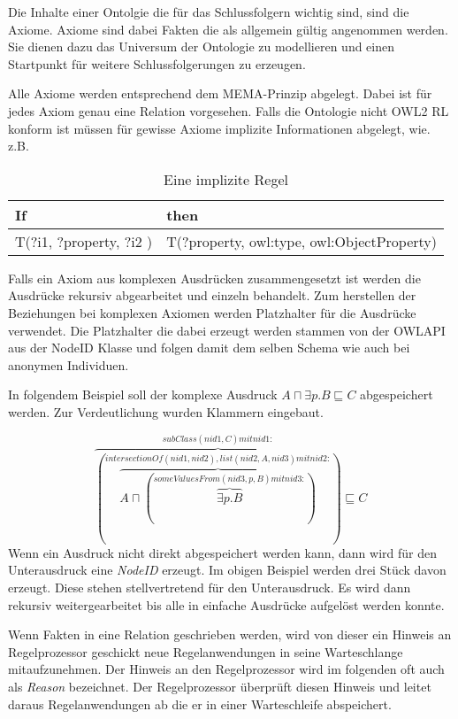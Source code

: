 Die Inhalte einer Ontolgie die für das Schlussfolgern wichtig sind, sind die Axiome. Axiome sind dabei Fakten die als allgemein gültig angenommen werden. Sie dienen dazu das Universum der Ontologie zu modellieren und einen Startpunkt für weitere Schlussfolgerungen zu erzeugen.

Alle Axiome werden entsprechend dem MEMA-Prinzip abgelegt. Dabei ist für jedes Axiom genau eine Relation vorgesehen. Falls die Ontologie nicht OWL2 RL konform ist müssen für gewisse Axiome implizite Informationen abgelegt, wie. z.B.

\begin{table}
	\caption{Eine implizite Regel}
	\label{rule-impl}
\begin{center}
	\begin{tabular}{l|l}
    If & then \\ \hline
	T(?i1, ?property, ?i2 ) & T(?property, owl:type, owl:ObjectProperty) \\
   \end{tabular}
\end{center}
\end{table}


Falls ein Axiom aus komplexen Ausdrücken zusammengesetzt ist werden die Ausdrücke rekursiv abgearbeitet und einzeln behandelt. Zum herstellen der Beziehungen bei komplexen Axiomen werden Platzhalter für die Ausdrücke verwendet. Die Platzhalter die dabei erzeugt werden stammen von der OWLAPI aus der NodeID Klasse und folgen damit dem selben Schema wie auch bei anonymen Individuen.

In folgendem Beispiel soll der komplexe Ausdruck $A \sqcap \exists p.B \sqsubseteq C$ abgespeichert werden. Zur Verdeutlichung wurden Klammern eingebaut.

\begin{equation}
\overbrace{
	(\overbrace{A \sqcap (
		\overbrace{\exists{}p.B}
		^{someValuesFrom(nid3, p, B) mit nid3:})}
	^{intersectionOf(nid1, nid2), list(nid2, A, nid3) mit nid2:})}
^{subClass(nid1, C) mit nid1:} \sqsubseteq C
\end{equation}
Wenn ein Ausdruck nicht direkt abgespeichert werden kann, dann wird für den Unterausdruck eine \emph{NodeID} erzeugt. Im obigen Beispiel werden drei Stück davon erzeugt. Diese stehen stellvertretend für den Unterausdruck. Es wird dann rekursiv weitergearbeitet bis alle in einfache Ausdrücke aufgelöst werden konnte.

Wenn Fakten in eine Relation geschrieben werden, wird von dieser ein Hinweis an Regelprozessor geschickt neue Regelanwendungen in seine Warteschlange mitaufzunehmen. Der Hinweis an den Regelprozessor wird im folgenden oft auch als \emph{Reason} bezeichnet.
Der Regelprozessor überprüft diesen Hinweis und leitet daraus Regelanwendungen ab die er in einer Warteschleife abspeichert.

